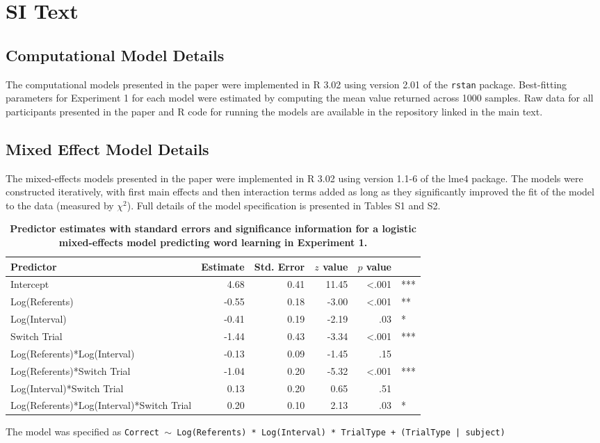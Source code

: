 \documentclass{pnastwo}
\begin{document}
\renewcommand\thetable{S\arabic{table}}

\section{SI Text}

\subsection{Computational Model Details}

The computational models presented in the paper were implemented in R 3.02 using version 2.01 of the \texttt{rstan} package. Best-fitting parameters for Experiment 1 for each model were estimated by computing the mean value returned across 1000 samples. Raw data for all participants presented in the paper and R code for running the models are available in the repository linked in the main text. 

\subsection{Mixed Effect Model Details}

The mixed-effects models presented in the paper were implemented in R 3.02 using version 1.1-6 of the lme4 package. The models were constructed iteratively, with first main effects and then interaction terms added as long as they significantly improved the fit of the model to the data (measured by $\chi^{2}$). Full details of the model specification is presented in Tables S1 and S2.

\begin{table}[ht]
\centering
\parbox{11cm}{\caption{\textbf{Predictor estimates with standard errors and significance information for a logistic mixed-effects model predicting word learning in Experiment 1.}}}
\begin{tabular}{lrrrrl}
 Predictor & Estimate & Std. Error & $z$ value & $p$ value &  \\ 
  \hline
Intercept & 4.68 & 0.41 & 11.45 & <.001 & *** \\ 
  Log(Referents) & -0.55 & 0.18 & -3.00 & <.001 & ** \\ 
  Log(Interval) & -0.41 & 0.19 & -2.19 & .03 & * \\ 
  Switch Trial & -1.44 & 0.43 & -3.34 & <.001 & *** \\ 
  Log(Referents)*Log(Interval) & -0.13 & 0.09 & -1.45 & .15 &  \\ 
  Log(Referents)*Switch Trial & -1.04 & 0.20 & -5.32 & <.001 & *** \\ 
  Log(Interval)*Switch Trial & 0.13 & 0.20 & 0.65 & .51 &  \\ 
  Log(Referents)*Log(Interval)*Switch Trial & 0.20 & 0.10 & 2.13 & .03 & * \\ 
   \hline
\end{tabular}
\vspace{6pt}
\parbox{11cm}{The model was specified as \small{\tt{Correct $\sim$  Log(Referents) * Log(Interval) * TrialType + (TrialType | subject)}}} 
\label{tab:exp1_reg}
\end{table}
\end{document}
